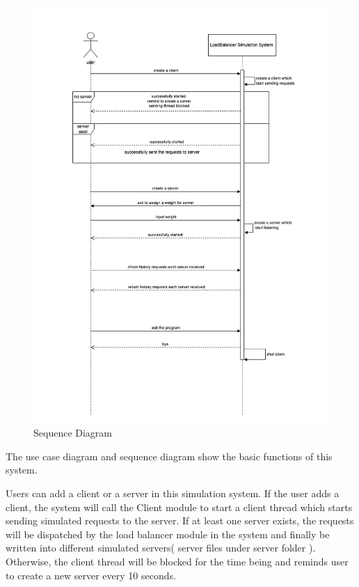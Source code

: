 \documentclass[12pt]{article}
\begin{document}
\begin{figure}[H]
    \centering
    \includegraphics[width=\linewidth]{images/seq.png}
    \caption{Sequence Diagram}
    \label{fig:Sequence_Diagram}
\end{figure}

The use case diagram and sequence diagram show the basic functions of this system. 

Users can add a client or a server in this simulation system. If the user adds a client, the system will call the Client module to start a client thread which starts sending simulated requests to the server. If at least one server exists, the requests will be dispatched by the load balancer module in the system and finally be written into different simulated servers( server files under server folder ). Otherwise, the client thread will be blocked for the time being and reminds user to create a new server every 10 seconds.
\end{document}
